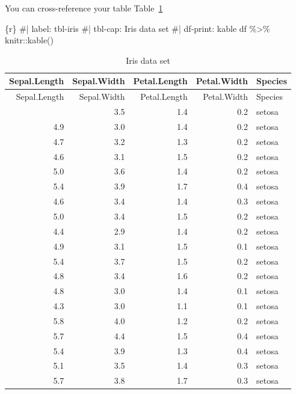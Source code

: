 \documentclass[
  letterpaper,
  DIV=11,
  numbers=noendperiod,
  oneside]{scrreprt}
\newenvironment{Shaded}{\begin{snugshade}}{\end{snugshade}}
\newcommand{\CommentTok}[1]{\textcolor[rgb]{0.37,0.37,0.37}{#1}}
\newcommand{\FunctionTok}[1]{\textcolor[rgb]{0.28,0.35,0.67}{#1}}
\newcommand{\InformationTok}[1]{\textcolor[rgb]{0.37,0.37,0.37}{#1}}
\newcommand{\NormalTok}[1]{\textcolor[rgb]{0.00,0.23,0.31}{#1}}
\newcommand{\SpecialCharTok}[1]{\textcolor[rgb]{0.37,0.37,0.37}{#1}}
\begin{document}
You can cross-reference your table Table~\ref{tbl-iris}

\begin{Shaded}
\begin{Highlighting}[]
\InformationTok{\textasciigrave{}\textasciigrave{}\textasciigrave{}\{r\}}
\CommentTok{\#| label: tbl{-}iris}
\CommentTok{\#| tbl{-}cap: Iris data set}
\CommentTok{\#| df{-}print: kable}
\NormalTok{df }\SpecialCharTok{\%\textgreater{}\%} 
\NormalTok{  knitr}\SpecialCharTok{::}\FunctionTok{kable}\NormalTok{()}
\InformationTok{\textasciigrave{}\textasciigrave{}\textasciigrave{}}
\end{Highlighting}
\end{Shaded}

\hypertarget{tbl-iris}{}
\begin{longtable}[]{@{}rrrrl@{}}
\caption{\label{tbl-iris}Iris data set}\tabularnewline
\toprule\noalign{}
Sepal.Length & Sepal.Width & Petal.Length & Petal.Width & Species \\
\midrule\noalign{}
\endfirsthead
\toprule\noalign{}
Sepal.Length & Sepal.Width & Petal.Length & Petal.Width & Species \\
\midrule\noalign{}
\endhead
\bottomrule\noalign{}
\endlastfoot
5.1 & 3.5 & 1.4 & 0.2 & setosa \\
4.9 & 3.0 & 1.4 & 0.2 & setosa \\
4.7 & 3.2 & 1.3 & 0.2 & setosa \\
4.6 & 3.1 & 1.5 & 0.2 & setosa \\
5.0 & 3.6 & 1.4 & 0.2 & setosa \\
5.4 & 3.9 & 1.7 & 0.4 & setosa \\
4.6 & 3.4 & 1.4 & 0.3 & setosa \\
5.0 & 3.4 & 1.5 & 0.2 & setosa \\
4.4 & 2.9 & 1.4 & 0.2 & setosa \\
4.9 & 3.1 & 1.5 & 0.1 & setosa \\
5.4 & 3.7 & 1.5 & 0.2 & setosa \\
4.8 & 3.4 & 1.6 & 0.2 & setosa \\
4.8 & 3.0 & 1.4 & 0.1 & setosa \\
4.3 & 3.0 & 1.1 & 0.1 & setosa \\
5.8 & 4.0 & 1.2 & 0.2 & setosa \\
5.7 & 4.4 & 1.5 & 0.4 & setosa \\
5.4 & 3.9 & 1.3 & 0.4 & setosa \\
5.1 & 3.5 & 1.4 & 0.3 & setosa \\
5.7 & 3.8 & 1.7 & 0.3 & setosa \\

\end{longtable}
\end{document}
